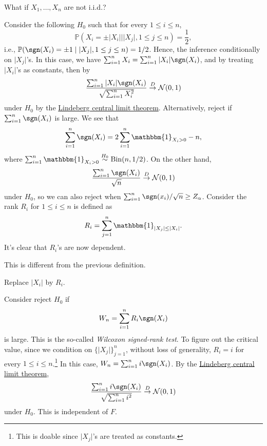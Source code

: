 \begin{problem*}
	What if \(X_1, \dots , X_n\) are not i.i.d.?
\end{problem*}
\begin{answer}
	Consider the following \(H_0\) such that for every \(1 \leq i \leq n\),
	\[
		\mathbb{P} (X_i = \pm \vert X_i \vert \mid \vert X_j \vert , 1 \leq j \leq n) = \frac{1}{2},
	\]
	i.e., \(\mathbb{P} (\sgn (X_i) = \pm 1 \mid \vert X_j \vert , 1 \leq j \leq n) = 1 / 2\). Hence, the inference conditionally on \(\vert X_j \vert \)'s. In this case, we have \(\sum_{i=1}^{n} X_i = \sum_{i=1}^{n} \vert X_i \vert \sgn (X_i)\), and by treating \(\vert X_i \vert \)'s as constants, then by
	\[
		\frac{\sum_{i=1}^{n} \vert X_i \vert \sgn (X_i)}{\sqrt{\sum_{i=1}^{n} X_i^2} }
		\overset{D}{\to} \mathcal{N} (0, 1)
	\]
	under \(H_0\) by the \hyperref[thm:Lindeberg-CLT]{Lindeberg central limit theorem}. Alternatively, reject if \(\sum_{i=1}^{n} \sgn (X_i) \) is large. We see that
	\[
		\sum_{i=1}^{n} \sgn (X_i)
		= 2 \sum_{i=1}^{n} \mathbbm{1}_{X_i > 0} - n,
	\]
	where \(\sum_{i=1}^{n} \mathbbm{1}_{X_i > 0} \overset{H_0}{\sim} \operatorname{Bin}(n, 1 / 2)\). On the other hand,
	\[
		\frac{\sum_{i=1}^{n} \sgn (X_i)}{\sqrt{n} } \overset{D}{\to} \mathcal{N} (0, 1)
	\]
	under \(H_0\), so we can also reject when \(\sum_{i=1}^{n} \sgn (x_i) / \sqrt{n} \geq Z_\alpha \). Consider the rank \(R_i\) for \(1 \leq i \leq n\) is defined as
	\[
		R_i = \sum_{j=1}^{n} \mathbbm{1}_{\vert X_j \vert \leq \vert X_i \vert }.
	\]
	It's clear that \(R_i\)'s are now dependent.

	\begin{prev}
		This is different from the previous definition.
	\end{prev}

	\begin{intuition}
		Replace \(\vert X_i \vert \) by \(R_i\).
	\end{intuition}

	Consider reject \(H_0\) if
	\[
		W_n = \sum_{i=1}^{n} R_i \sgn (X_i)
	\]
	is large. This is the so-called \emph{Wilcoxon signed-rank test}. To figure out the critical value, since we condition on \(\{ \vert X_j \vert \}_{j = 1}^n \), without loss of generality, \(R_i = i\) for every \(1 \leq i \leq n\).\footnote{This is doable since \(\vert X_j \vert \)'s are treated as constants.} In this case, \(W_n = \sum_{i=1}^{n} i \sgn (X_i)\). By the \hyperref[thm:Lindeberg-CLT]{Lindeberg central limit theorem},
	\[
		\frac{\sum_{i=1}^{n} i \sgn (X_i)}{\sqrt{\sum_{i=1}^{n} i^2} }
		\overset{D}{\to} \mathcal{N} (0, 1)
	\]
	under \(H_0\). This is independent of \(F\).
\end{answer}

